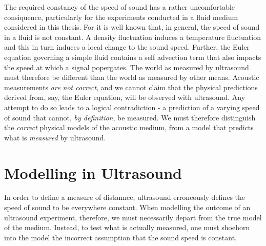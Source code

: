 The required constancy of the speed of sound has a rather uncomfortable consiquence,
particularly for the experiments conducted in a fluid medium considered in this thesis.
For it is well known that, in general, the speed of sound in a fluid is not constant.
A density fluctuation induces a temperature fluctuation and this in turn induces a local change to the sound speed.
Further, the Euler equation governing a simple fluid contains a self advection term that also impacts the speed at which a signal popergates.
The world as measured by ultrasound must therefore be different than the world as measured by other means.
Acoustic measurements {\em are not correct}, 
and we cannot claim that the physical predictions derived from, say, the Euler equation,
will be observed with ultrasound.
Any attempt to do so leads to a logical contradiction -
a prediction of a varying speed of sound that cannot, {\em by definition}, be measured.
We must therefore distinguish the {\em correct} physical models of the acoustic medium,
from a model that predicts what is {\em measured} by ultrasound. 




\section{Modelling in Ultrasound}

In order to define a measure of distannce,
ultrasound erroneously defines the speed of sound to be everywhere constant.
When modelling the outcome of an ultrasound experiment,
therefore,
we must necessarily depart from the true model of the medium.
Instead,
to test what is actually measured,
one must shoehorn into the model the incorrect assumption that the sound speed is constant.

